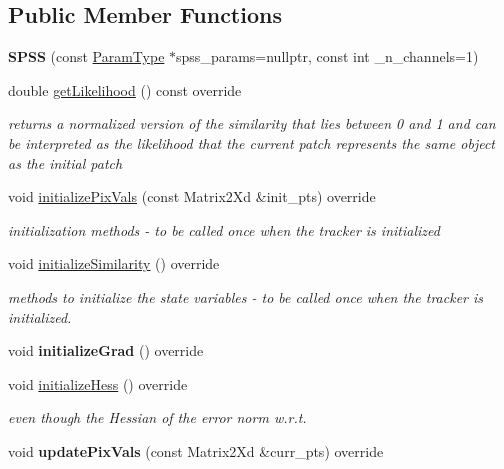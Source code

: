 \subsection*{Public Member Functions}
\begin{DoxyCompactItemize}
\item 
\hypertarget{classSPSS_ab20b5613ae14f25be7353e06075e4412}{{\bfseries S\-P\-S\-S} (const \hyperlink{structSPSSParams}{Param\-Type} $\ast$spss\-\_\-params=nullptr, const int \-\_\-n\-\_\-channels=1)}\label{classSPSS_ab20b5613ae14f25be7353e06075e4412}

\item 
\hypertarget{classSPSS_af0f5a2a9467f455a19d93ed073cd621e}{double \hyperlink{classSPSS_af0f5a2a9467f455a19d93ed073cd621e}{get\-Likelihood} () const override}\label{classSPSS_af0f5a2a9467f455a19d93ed073cd621e}

\begin{DoxyCompactList}\small\item\em returns a normalized version of the similarity that lies between 0 and 1 and can be interpreted as the likelihood that the current patch represents the same object as the initial patch \end{DoxyCompactList}\item 
\hypertarget{classSPSS_a957babe5d0e8b230a7f76c5cd9b4fe89}{void \hyperlink{classSPSS_a957babe5d0e8b230a7f76c5cd9b4fe89}{initialize\-Pix\-Vals} (const Matrix2\-Xd \&init\-\_\-pts) override}\label{classSPSS_a957babe5d0e8b230a7f76c5cd9b4fe89}

\begin{DoxyCompactList}\small\item\em initialization methods -\/ to be called once when the tracker is initialized \end{DoxyCompactList}\item 
void \hyperlink{classSPSS_a9f9bc491b562ca191934ef40304c90e8}{initialize\-Similarity} () override
\begin{DoxyCompactList}\small\item\em methods to initialize the state variables -\/ to be called once when the tracker is initialized. \end{DoxyCompactList}\item 
\hypertarget{classSPSS_aad8cdf9bf5e7c01f6d0cafd420b971b8}{void {\bfseries initialize\-Grad} () override}\label{classSPSS_aad8cdf9bf5e7c01f6d0cafd420b971b8}

\item 
void \hyperlink{classSPSS_af8fd6ef2a745be8a7fe899586c486ecc}{initialize\-Hess} () override
\begin{DoxyCompactList}\small\item\em even though the Hessian of the error norm w.\-r.\-t. \end{DoxyCompactList}\item 
\hypertarget{classSPSS_a758c9574e73eec78f8ad8dc8c854662b}{void {\bfseries update\-Pix\-Vals} (const Matrix2\-Xd \&curr\-\_\-pts) override}\label{classSPSS_a758c9574e73eec78f8ad8dc8c854662b}


\end{DoxyCompactItemize}
